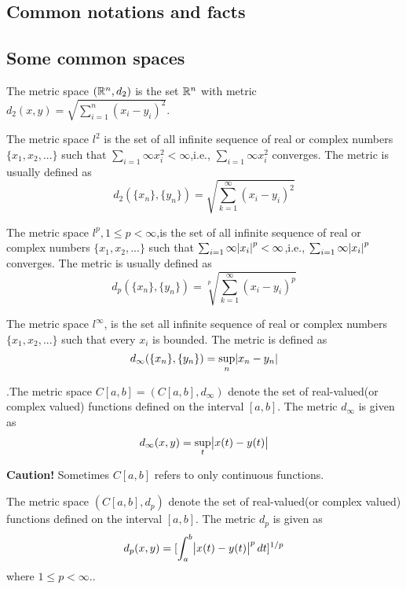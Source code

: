 
\begin{refsection}
\startcontents[chapters]	
\chapter{Common notations and facts}\label{appendix}

\section{Some common spaces}\label{appendix:sec:some-common-spaces}
The metric space $(\mathbb{R}^n,d_2)$ is the set $\mathbb{R}^n$ with metric $d_2(x,y) = \sqrt{\sum_{i=1}^n (x_i - y_i)^2}$.

\cite[122]{johnsonbaugh2010foundations}The metric space $l^2$ is the set of all infinite sequence of real or complex numbers $\{x_1,x_2,...\}$ such that $\sum_{i=1}\infty x_i^2 < \infty$,i.e., $\sum_{i=1}\infty x_i^2$ converges. The metric is usually defined as $$d_2(\{x_n\},\{y_n\}) = \sqrt{\sum_{k=1}^\infty (x_i-y_i)^2}$$ 

The metric space $l^p, 1\leq p < \infty$,is the set of all infinite sequence of real or complex numbers $\{x_1,x_2,...\}$ such that $\sum_{i=1}\infty \abs{x_i}^p < \infty$,i.e., $\sum_{i=1}\infty \abs{x_i}^p$ converges. The metric is usually defined as $$d_p(\{x_n\},\{y_n\}) = \sqrt[p]{\sum_{k=1}^\infty (x_i-y_i)^p}$$

The metric space $l^\infty$, is the set all infinite sequence of real or complex numbers $\{x_1,x_2,...\}$ such that every $x_i$ is bounded. The metric is defined as
$$d_\infty(\{x_n\},\{y_n\}) = \sup_n \abs{x_n-y_n}$$


\cite[75]{moon2000mathematical}.The metric space $C[a,b] = (C[a,b],d_\infty)$ denote the set of real-valued(or complex valued) functions defined on the interval $[a,b]$. The metric $d_\infty$ is given as
$$d_\infty(x,y) = \sup_t \abs{x(t)-y(t)}$$


\begin{remark}
\textbf{Caution!} Sometimes $C[a,b]$ refers to only continuous functions.\cite[23]{luenberger1969optimization}
\end{remark}

The metric space $(C[a,b],d_p)$ denote the set of real-valued(or complex valued) functions defined on the interval $[a,b]$. The metric $d_p$ is given as
$$d_p(x,y) = [\int_a^b\abs{x(t)-y(t)}^pdt]^{1/p}$$
where $1 \leq p < \infty$.\cite[75]{moon2000mathematical}.




\end{refsection}
